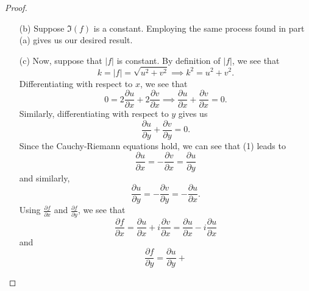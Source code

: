 \documentclass[11pt,a4paper]{book}
\begin{document}
\begin{enumerate}
\begin{proof}
\begin{enumerate}
\item[(b)] Suppose \( \Im(f) \) is a constant. Employing the same process found in part (a) gives us our desired result.
\item[(c)] Now, suppose that \( | f  |  \) is constant. By definition of \( | f |  \), we see that  
    \[   k = | f  |  = \sqrt{ u^{2} + v^{2} } \implies k^{2} = u^{2} + v^{2}. \]
    Differentiating with respect to \( x  \), we see that
    \[  0 = 2 \frac{\partial u }{\partial x }  + 2 \frac{\partial v }{\partial x } \implies \frac{\partial u }{\partial x } + \frac{\partial v }{\partial x }  = 0. \tag{1} \]
    Similarly, differentiating with respect to \( y  \) gives us
    \[   \frac{\partial u }{\partial y }  + \frac{\partial v }{\partial y } = 0. \tag{2} \]
    Since the Cauchy-Riemann equations hold, we can see that (1) leads to
    \[ \frac{\partial u }{\partial x }  = - \frac{\partial v }{\partial x } = \frac{\partial u }{\partial y }  \]
    and similarly, 
    \[  \frac{\partial u }{\partial y } = - \frac{\partial v }{\partial y } = - \frac{\partial u }{\partial x }.    \]
        Using \( \frac{\partial f }{\partial x }  \) and \( \frac{\partial f }{\partial y }  \), we see that
        \[  \frac{\partial f }{\partial x }  = \frac{\partial u }{\partial x }  + i \frac{\partial v }{\partial x }  = \frac{\partial u }{\partial x }  - i \frac{\partial u }{\partial x }  \]
        and
        \[  \frac{\partial f }{\partial y }  = \frac{\partial u }{\partial y }  +   \]

        
        \end{enumerate} 
        \end{proof}
\end{enumerate}
\end{document}
